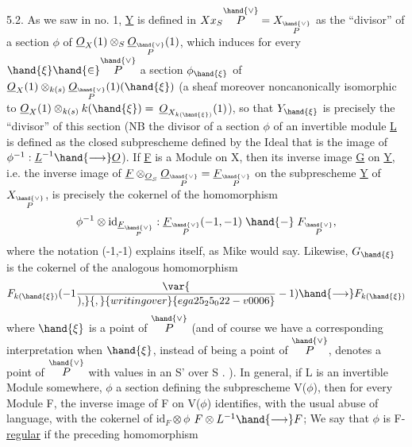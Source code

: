 5.2. As we saw in no. 1, \underline{Y} is defined in $X x_S \overset{\hand{\vee}}{P} = X_{\overset{\hand{\vee}}{P}}$
as the “divisor” of a section $\phi$ of $\underline{O}_X(1)\otimes_S \underline{O}_{\overset{\hand{\vee}}{P}}(1)$, which induces for
every $\hand{\xi} \hand{\in} \overset{\hand{\vee}}{P}$ a section $\phi_{\hand{\xi}}$ of  $\underline{O}_X(1)\otimes_{k(s)}\underline{O}_{\overset{\hand{\vee}}{P}}(1)(\hand{\xi})$
(a sheaf moreover noncanonically isomorphic to $\underline{O}_X(1)\otimes_{k(s)}k(\hand{\xi}) =$
$\underline{O}_{X_{k(\hand{\xi})}}(1)$), so that $Y_{\hand{\xi}}$ is precisely the  “divisor” of
this section (NB the divisor of a section $\phi$ of an invertible module \underline{L} 
is defined as the closed subprescheme defined by the Ideal that is the image of
$\phi^{-1} : \underline{L}^{-1} \hand{\longrightarrow} \underline{O}$). If \underline{F} is a Module on X, then its inverse image \underline{G}
on \underline{Y}, i.e. the inverse image of $\underline{F}\otimes_{\underline{O}_S}\underline{O}_{\overset{\hand{\vee}}{P}} = \underline{F}_{\overset{\hand{\vee}}{P}}$ on the subprescheme \underline{Y} of
$X_{\overset{\hand{\vee}}{P}}$, is precisely the cokernel of the homomorphism
\[ \phi^{-1}\otimes \mathrm{id}_{\underline{F}_{\overset{\hand{\vee}}{P}}} : \underline{F}_{\overset{\hand{\vee}}{P}}(-1,-1) \mathrel{\hand{-}} F_{\overset{\hand{\vee}}{P}} , \]
where the notation (-1,-1) explains itself, as Mike would say. Likewise,
$G_{\hand{\xi}}$ is the cokernel of the analogous homomorphism
\[ F_{k(\hand{\xi})}(-1\var{\over{)}{,}}{,}{writing over}{ega25_25_022-v0006}-1) \hand{\longrightarrow} F_{k(\hand{\xi})} \]
where $\hand{\xi}$ is a point of $\overset{\hand{\vee}}{P}$ (and of course we have a corresponding
interpretation when $\hand{\xi}$, instead of being a point of $\overset{\hand{\vee}}{P}$, denotes a point
of $\overset{\hand{\vee}}{P}$ with values in an S' over S . ). \hand{\unsure{(}}In general, if L is an
invertible Module somewhere, $\phi$ a section defining the subprescheme
V($\phi$), then for every Module F, the inverse image of F on V($\phi$)
identifies, with the usual abuse of language, with the cokernel of $\mathrm{id}_F\otimes\phi$
$F\otimes L^{-1} \hand{\longrightarrow} F$; We say that $\phi$ is F-\uline{regular} if the preceding homomorphism
